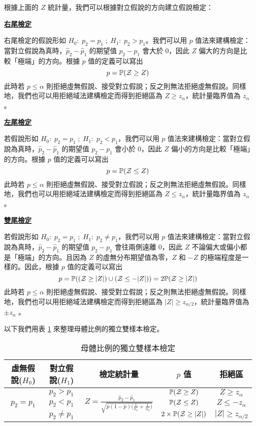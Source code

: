    根據上面的 $Z$ 統計量，我們可以根據對立假說的方向建立假說檢定：

    \noindent\underline{\textbf{右尾檢定}}

    右尾檢定的假說形如 $H_0: \; p_2 = p_1 \; ; \; H_1: \; p_2 > p_1$。我們可以用 $p$ 值法來建構檢定：當對立假說為真時，$\hat{p}_2 - \hat{p}_1$ 的期望值 $p_2 - p_1$ 會大於 0，因此 $Z$ 偏大的方向是比較「極端」的方向。根據 $p$ 值的定義可以寫出
    \[p = \mathbb{P}(\mathcal{Z} \ge Z)\]
    此時若 $p \le \alpha$ 則拒絕虛無假說、接受對立假說；反之則無法拒絕虛無假說。同樣地，我們也可以用拒絕域法建構檢定而得到拒絕區為 $Z \ge z_\alpha$，統計量臨界值為 $z_\alpha$。

    \noindent\underline{\textbf{左尾檢定}}

    若假說形如 $H_0: \; p_2 = p_1 \; ; \; H_1: \; p_2 < p_1$，我們可以用 $p$ 值法來建構檢定：當對立假說為真時，$\hat{p}_2 - \hat{p}_1$ 的期望值 $p_2 - p_1$ 會小於 0，因此 $Z$ 偏小的方向是比較「極端」的方向。根據 $p$ 值的定義可以寫出
    \[p = \mathbb{P}(\mathcal{Z} \le Z)\]
    此時若 $p \le \alpha$ 則拒絕虛無假說、接受對立假說；反之則無法拒絕虛無假說。同樣地，我們也可以用拒絕域法建構檢定而得到拒絕區為 $Z \le z_\alpha$，統計量臨界值為 $z_\alpha$。

    \noindent\underline{\textbf{雙尾檢定}}

    若假說形如 $H_0: \; p_2 = p_1 \; ; \; H_1: \; p_2 \ne p_1$，我們可以用 $p$ 值法來建構檢定：當對立假說為真時，$\hat{p}_2 - \hat{p}_1$ 的期望值 $p_2 - p_1$ 會往兩側遠離 0，因此 $Z$ 不論偏大或偏小都是「極端」的方向。且因為 $Z$ 的虛無分布期望值為零，$Z$ 和 $-Z$ 的極端程度是一樣的。因此，根據 $p$ 值的定義可以寫出
    \[p = \mathbb{P}((\mathcal{Z} \ge |Z|)\cup(\mathcal{Z} \le -|Z|)) = 2\mathbb{P}(\mathcal{Z} \ge |Z|)\]
    此時若 $p \le \alpha$ 則拒絕虛無假說、接受對立假說；反之則無法拒絕虛無假說。同樣地，我們也可以用拒絕域法建構檢定而得到拒絕區為 $|Z| \ge z_{\alpha/2}$，統計量臨界值為 $\pm z_{\alpha}$ 。

    以下我們用表 \ref{tab:two_sample_proportion} 來整理母體比例的獨立雙樣本檢定。

    \begin{table}[htbp]
        \begin{center}
            \begin{tabular}{ccccc}
                \toprule
                虛無假說($H_0$) & 對立假說($H_1$) & 檢定統計量 & $p$ 值 & 拒絕區\\
                \hline
                \multirow{3}{*}{$p_2 = p_1$} & $p_2 > p_1$ & \multirow{3}{*}{$Z = \frac{\hat{p}_2-\hat{p}_1}{\sqrt{\bar{p}(1-\bar{p})\big(\frac{1}{n_1} + \frac{1}{n_2}\big)}}$} & $\mathbb{P}(\mathcal{Z} \ge Z)$ & $Z \ge z_{\alpha}$\\
                & $p_2 < p_1$ & &$\mathbb{P}(\mathcal{Z} \le Z)$&$Z \le -z_{\alpha}$\\
                & $p_2 \ne p_1$ & &$2\times\mathbb{P}(\mathcal{Z} \ge |Z|)$&$|Z| \ge z_{\alpha/2}$\\
                \bottomrule
            \end{tabular}
            \caption{母體比例的獨立雙樣本檢定\label{tab:two_sample_proportion}}
        \end{center}
    \end{table}

